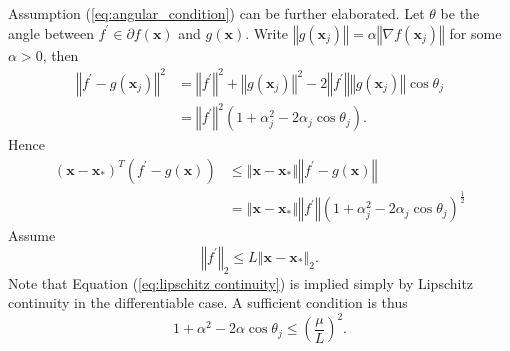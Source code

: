 \documentclass{article}
\renewcommand{\vec}[1]{\boldsymbol{#1}}
\newcommand{\norm}[1]{\left\Vert #1 \right\Vert}
\begin{document}
Assumption (\ref{eq:angular_condition}) can be further elaborated.
Let $\theta$ be the angle between $f^\prime \in\partial f(\vec{x})$ and $g(\vec{x})$. Write $\norm{g(\vec{x}_j)} = \alpha \norm{\nabla f(\vec{x}_j)}$ for some $\alpha>0$,
then
\begin{align}
	\norm{f^\prime-g(\vec{x}_j)}^2 &= \norm{f^\prime}^2 + \norm{g(\vec{x}_j)}^2 -2\norm{f^\prime}\norm{g(\vec{x}_j)}\cos\theta_j\\
	&=  \norm{f^\prime}^2(1+\alpha_j^2-2\alpha_j \cos\theta_j).
\end{align}
Hence
\begin{align}
	(\vec{x}-\vec{x}_*)^T (f^\prime -g(\vec{x})) &\leq \norm{\vec{x}-\vec{x}_*} \norm{f^\prime -g(\vec{x})}\\
	&= \norm{\vec{x}-\vec{x}_*} \norm{f^\prime}(1+\alpha_j^2-2\alpha_j \cos\theta_j)^{\frac{1}{2}}
\end{align}
Assume
\begin{equation}
\norm{f^\prime}_2\leq L \norm{\vec{x}-\vec{x}_*}_2.
\label{eq:lipschitz continuity}
\end{equation}
Note that Equation (\ref{eq:lipschitz continuity}) is implied simply by Lipschitz continuity in the differentiable case.
A sufficient condition is thus
\begin{equation}
	1+\alpha^2-2\alpha \cos\theta_j\leq \left(\frac{\mu}{L}\right)^2.
\end{equation}
\end{document}
